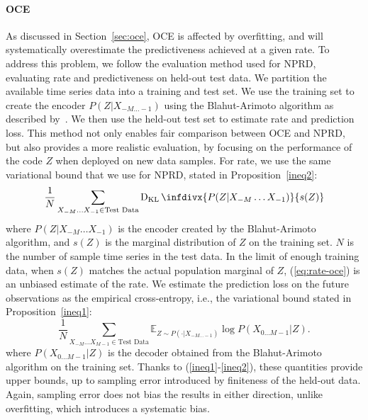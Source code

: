 \documentclass[entropy,article,submit,moreauthors,pdftex,10pt,a4paper]{Definitions/mdpi}
\newcommand{\E}[0]{\mathbb{E}}
\newcommand{\finitefuture}{X_{0\dots M-1}}
\begin{document}
\paragraph{OCE}
As discussed in Section~\ref{sec:oce}, OCE is affected by overfitting, %
and will systematically overestimate the predictiveness achieved at a given rate.
To address this problem, we follow the evaluation method used for NPRD, evaluating rate and predictiveness on held-out test data.
We partition the available time series data into a training and test set. We use the training set to create the encoder $P(Z|X_{-M\dots -1})$ using the Blahut-Arimoto algorithm as described by~\citet{still-optimal-2010}.
We then use the held-out test set to estimate rate and prediction loss.
This method not only enables fair comparison between OCE and NPRD, but also provides a more realistic evaluation, by focusing on the performance of the code $Z$ when deployed on new data samples.
For rate, we use the same variational bound that we use for NPRD, stated in Proposition~\ref{ineq2}:
\begin{equation}\label{eq:rate-oce}
\frac{1}{N} \sum_{X_{-M}\dots X_{-1} \in \text{Test Data}} \operatorname{D_{KL}}\infdivx{P(Z|X_{-M}\dots X_{-1})}{s(Z)}
\end{equation}
where $P(Z|X_{-M}\dots X_{-1})$ is the encoder created by the Blahut-Arimoto algorithm, and $s(Z)$ is the marginal distribution of $Z$ on the training set.
$N$ is the number of sample time series in the test data.
In the limit of enough training data, when $s(Z)$ matches the actual population marginal of $Z$, (\ref{eq:rate-oce}) is an unbiased estimate of the rate. %
We estimate the prediction loss on the future observations as the empirical cross-entropy, i.e., the variational bound stated in Proposition~\ref{ineq1}:
\begin{equation}
\frac{1}{N} \sum_{X_{-M}\dots X_{M-1} \in \text{Test Data}} \E_{Z \sim P(\cdot|X_{-M \dots -1})} \log P(\finitefuture|Z).
\end{equation}
where $P(\finitefuture|Z)$ is the decoder obtained from the Blahut-Arimoto algorithm on the training set.
Thanks to (\ref{ineq1}-\ref{ineq2}), these quantities provide upper bounds, up to sampling error introduced by finiteness of the held-out data.
Again, sampling error does not bias the results in either direction, unlike overfitting, which introduces a systematic bias.
\end{document}
